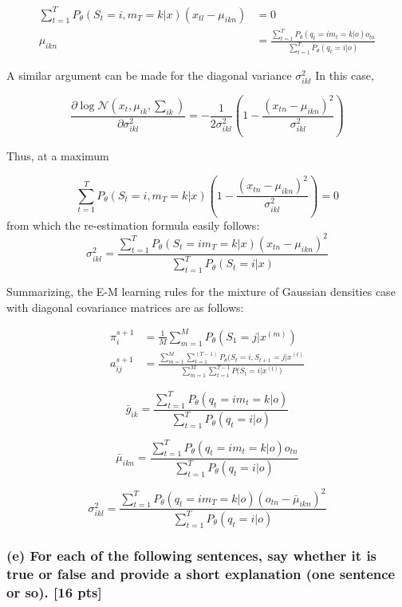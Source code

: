 \documentclass[twoside,11pt]{article}\usepackage{amsmath,amsfonts,amsthm,fullpage}
\begin{document}
\begin{equation} \nonumber
\begin{split}
\sum_{t=1}^{T} P_\theta(S_t = i, m_T = k | x)(x_{tl} - \mu_{ikn}) &= 0 \\
\mu_{ikn} &= \frac {\sum_{t=1}^{T} P_\theta (q_t =i m_t = k | o) o_{tn}} {\sum_{t=1}^{T} P_\theta(q_t=i | o)}
\end{split}
\end{equation}

A similar argument can be made for the diagonal variance $\sigma_{ikl}^{2}$ In this case,

$$ \frac{\partial \log \mathcal{N} (x_t, \mu_{ik}, \sum_{ik} )}{ \partial \sigma_{ikl}^{2} } = - \frac{1}{2\sigma_{ikl}^{2}} (1 - \frac{ (x_{tn} - \mu_{ikn} )^{2} }{\sigma_{ikl}^{2}})$$

Thus, at a maximum 

$$ \sum_{t=1}^{T} P_\theta(S_t=i, m_T = k|x)(1 - \frac{ (x_{tn} - \mu_{ikn} )^{2} }{\sigma_{ikl}^{2}}) = 0 $$
from which the re-estimation formula easily follows: 
$$
	\sigma_{ikl}^{2} = \frac{ \sum_{t=1}^{T} P_\theta(S_t=i m_T = k|x)(x_{tn} - \mu_{ikn} )^{2} }{\sum_{t=1}^{T} P_\theta(S_t=i|x)}
$$

Summarizing, the E-M learning rules for the mixture of Gaussian densities case with diagonal
covariance matrices are as follows:

\begin{equation} \nonumber
\begin{split}
\pi_i^{s+1} &= \frac{1}{M} \sum^M_{m=1} P_{\theta}(S_1 = j | x^{(m)}) \\
a_{ij}^{s+1} &= \frac{\sum^M_{m=1} \sum^(T-1)_{t=1} P_{\theta}({S_{t} = i,  S_{t+1} = j | x^{(t)}}}{ \sum^M_{m=1} \sum^{T-1}_{t=1} P({S_{t} = i | x^{(t)})}}
\end{split}
\end{equation}

$$ \bar{g}_{ik} =  \frac{ \sum_{t=1}^{T} P_\theta(q_t = i m_t = k | o)} { \sum_{t=1}^{T} P_\theta ( q_t = i | o)} $$

$$ \bar{\mu}_{ikn} = \frac {\sum_{t=1}^{T} P_\theta (q_t =i m_t = k | o) o_{tn}} {\sum_{t=1}^{T} P_\theta(q_t=i | o)}$$

$$
	\sigma_{ikl}^{2} = \frac{ \sum_{t=1}^{T} P_\theta(q_t=i m_T = k|o)(o_{tn} - \bar{\mu}_{ikn} )^{2} }{\sum_{t=1}^{T} P_\theta(q_t=i|o)}
$$


\subsubsection*{(e) For each of the following sentences, say whether it is true or false and provide a short explanation (one
sentence or so). [16 pts]}
\end{document}
